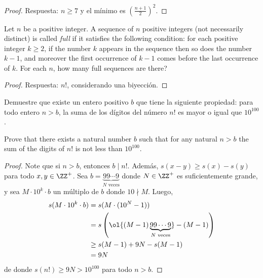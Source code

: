 \begin{proof}
  Respuesta: $n\ge 7$ y el mínimo es $\left(\frac{n+1}{2}\right)^2$.
\end{proof}

\begin{probMR}[ISL 2002/C3]
  Let $n$ be a positive integer. A sequence of $n$ positive integers (not
  necessarily distinct) is called \emph{full} if it satisfies the following
  condition: for each positive integer $k\ge 2$, if the number $k$ appears in
  the sequence then so does the number $k-1$, and moreover the first occurrence
  of $k-1$ comes before the last occurrence of $k$. For each $n$, how many full
  sequences are there?
\end{probMR}

\begin{proof}
  Respuesta: $n!$, considerando una biyección.
\end{proof}


\begin{probEG}
  Demuestre que existe un entero positivo $b$ que tiene la siguiente propiedad:
  para todo entero $n>b$, la suma de los dígitos del número $n!$ es mayor o
  igual que $10^{100}$.
  \begin{hint}
    Prove that there exists a natural number $b$ such that for any natural $n>b$
    the sum of the digits of $n!$ is not less than $10^{100}$.
  \end{hint}
\end{probEG}

\begin{proof}
  Note que si $n>b$, entonces $b\mid n!$. Además, $s(x-y)\ge s(x)-s(y)$ para
  todo $x,y\in\ZZ^+$. Sea $b=\underbrace{99\cdots 9}_{N\text{ veces}}$ donde
  $N\in\ZZ^+$ es suficientemente grande, y sea $M\cdot 10^k\cdot b$ un múltiplo
  de $b$ donde $10\nmid M$. Luego,
  \begin{align*}
    s(M\cdot 10^k\cdot b)
    &= s(M\cdot(10^N-1)) \\
    &= s\left(\ol{(M-1)\underbrace{99\cdots 9}_{N\text{ veces}}}-(M-1)\right) \\
    &\ge s(M-1)+9N-s(M-1) \\
    &= 9N
  \end{align*}
  de donde $s(n!)\ge 9N>10^{100}$ para todo $n>b$.
\end{proof}


